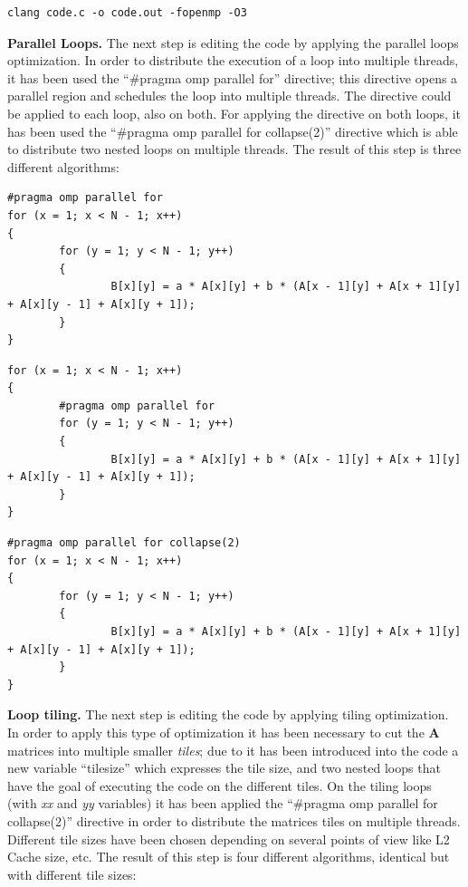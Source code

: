 \documentclass[conference]{IEEEtran}
\newcommand{\mypar}[1]{{\bf #1.}}
\begin{document}
\begin{lstlisting}[caption={Flag -O3},label={lst:optimization-flags-3}]
clang code.c -o code.out -fopenmp -O3
\end{lstlisting}

\mypar{Parallel Loops}
The next step is editing the code by applying the parallel loops optimization. In order to distribute the execution of a loop into multiple threads, it has been used the ``#pragma omp parallel for'' \cite{omp-parallel}\cite{omp-for} directive; this directive opens a parallel region and schedules the loop into multiple threads. The directive could be applied to each loop, also on both. For applying the directive on both loops, it has been used the ``#pragma omp parallel for collapse(2)'' \cite{omp-collapse} directive which is able to distribute two nested loops on multiple threads. The result of this step is three different algorithms:

\setcounter{lstlisting}{2}
\renewcommand{\lstlistingname}{Algorithm}

\begin{lstlisting}[caption={Parallel loop on X},label={lst:parallel-loop-x}]
#pragma omp parallel for
for (x = 1; x < N - 1; x++)
{
		for (y = 1; y < N - 1; y++)
		{
				B[x][y] = a * A[x][y] + b * (A[x - 1][y] + A[x + 1][y] + A[x][y - 1] + A[x][y + 1]);
		}
}
\end{lstlisting}

\begin{lstlisting}[caption={Parallel loop on Y},label={lst:parallel-loop-y}]
for (x = 1; x < N - 1; x++)
{
		#pragma omp parallel for
		for (y = 1; y < N - 1; y++)
		{
				B[x][y] = a * A[x][y] + b * (A[x - 1][y] + A[x + 1][y] + A[x][y - 1] + A[x][y + 1]);
		}
}
\end{lstlisting}

\begin{lstlisting}[caption={Parallel loop on X and Y},label={lst:parallel-loop-x-y}]
#pragma omp parallel for collapse(2)
for (x = 1; x < N - 1; x++)
{
		for (y = 1; y < N - 1; y++)
		{
				B[x][y] = a * A[x][y] + b * (A[x - 1][y] + A[x + 1][y] + A[x][y - 1] + A[x][y + 1]);
		}
}
\end{lstlisting}

\mypar{Loop tiling}
The next step is editing the code by applying tiling optimization. In order to apply this type of optimization it has been necessary to cut the \textbf{A} matrices into multiple smaller \textit{tiles}; due to it has been introduced into the code a new variable ``tile\textunderscore size'' which expresses the tile size, and two nested loops that have the goal of executing the code on the different tiles. On the tiling loops (with \textit{xx} and \textit{yy} variables) it has been applied the ``#pragma omp parallel for collapse(2)'' directive in order to distribute the matrices tiles on multiple threads. Different tile sizes have been chosen depending on several points of view like L2 Cache size, etc. The result of this step is four different algorithms, identical but with different tile sizes:
\end{document}
